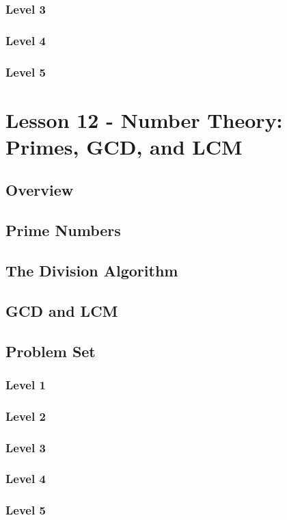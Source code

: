 \documentclass{article}
\begin{document}
\subsubsection{Level 3}
\subsubsection{Level 4}
\subsubsection{Level 5}
\pagebreak

\section{Lesson 12 - Number Theory: Primes, GCD, and LCM}
\subsection{Overview}
\subsection{Prime Numbers}
\subsection{The Division Algorithm}
\subsection{GCD and LCM}
\subsection{Problem Set}
\subsubsection{Level 1}
\subsubsection{Level 2}
\subsubsection{Level 3}
\subsubsection{Level 4}
\subsubsection{Level 5}
\pagebreak
\end{document}
